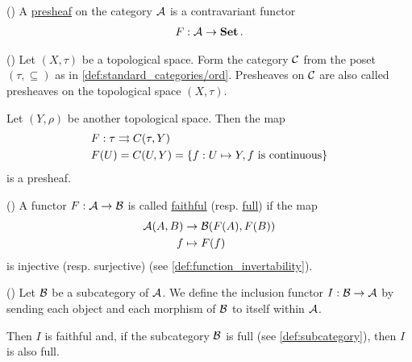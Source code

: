\begin{definition}\label{def:presheaf}(\cite[definition 1.2.15]{Leinster2014})
  A \uline{presheaf} on the category $\mathcal A$ is a contravariant functor
  \begin{align*}
    F: \mathcal A \to \operatorname{\mathbf{Set}}.
  \end{align*}
\end{definition}

\begin{example}\label{ex:topological_space_presheaf}(\cite[24]{Leinster2014})
  Let $(X, \tau)$ be a topological space. Form the category $\mathcal C$ from the poset $(\tau, \subseteq)$ as in \cref{def:standard_categories/ord}. Presheaves on $\mathcal C$ are also called presheaves on the topological space $(X, \tau)$.

  Let $(Y, \rho)$ be another topological space. Then the map
  \begin{align*}
    &F: \tau \rightrightarrows C(\tau, Y) \\
    &F(U) = C(U, Y) = \{ f: U \mapsto Y, f \text{ is continuous} \}
  \end{align*}
  is a presheaf.
\end{example}

\begin{definition}\label{def:faithful_full_functors}(\cite[definition 1.2.16]{Leinster2014})
  A functor $F: \mathcal A \to \mathcal B$ is called \uline{faithful} (resp. \uline{full}) if the map
  \begin{align*}
    \mathcal A(A, B) &\to \mathcal B(F(A), F(B)) \\
    f &\mapsto F(f)
  \end{align*}
  is injective (resp. surjective) (see \cref{def:function_invertability}).
\end{definition}

\begin{example}\label{def:subcategory_functors}(\cite[25]{Leinster2014})
  Let $\mathcal B$ be a subcategory of $\mathcal A$. We define the inclusion functor $I: \mathcal B \to \mathcal A$ by sending each object and each morphism of $\mathcal B$ to itself within $\mathcal A$.

  Then $I$ is faithful and, if the subcategory $\mathcal B$ is full (see \cref{def:subcategory}), then $I$ is also full.
\end{example}

